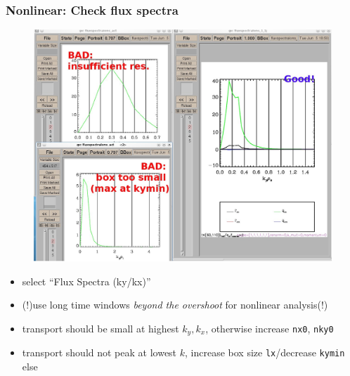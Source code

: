 \documentclass[9pt]{beamer}
\begin{document}
\begin{frame}
  \frametitle{Nonlinear: Check flux spectra}

\begin{figure}
\includegraphics[height=0.6\textheight]{figs/fluxspectra.jpg}
\end{figure}

\begin{block}{}
\begin{itemize}
 \item select ``Flux Spectra (ky/kx)''
 \item (!)use long time windows {\em beyond the overshoot} for nonlinear analysis(!)
 \item transport should be small at highest $k_y, k_x$, otherwise increase {\tt nx0}, {\tt nky0}
 \item transport should not peak at lowest $k$, increase box size {\tt lx}/decrease {\tt kymin} else
\end{itemize}

\end{block}


\end{frame}

\end{document}
